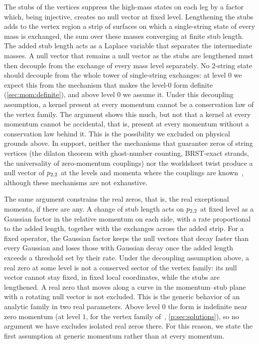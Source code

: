The stubs of the vertices suppress the high-mass states on each leg by a factor which, being injective, creates no null vector at fixed level.
Lengthening the stubs adds to the vertex region a strip of surfaces on which a single-string state of every mass is exchanged, the sum over these masses converging at finite stub length.
  The added stub length acts as a Laplace variable that separates the intermediate masses.
  A null vector that remains a null vector as the stubs are lengthened must then decouple from the exchange of every mass level separately.
  No $2$-string state should decouple from the whole tower of single-string exchanges: at level $0$ we expect this from the mechanism that makes the level-$0$ form definite (\cref{sec:mom:definite}), and above level $0$ we assume it.
  Under this decoupling assumption, a kernel present at every momentum cannot be a conservation law of the vertex family.
  The argument shows this much, but not that a kernel at every momentum cannot be accidental, that is, present at every momentum without a conservation law behind it.
  This is the possibility we excluded on physical grounds above.
  In support, neither the mechanisms that guarantee zeros of string vertices (the dilaton theorem with ghost-number counting, BRST-exact strands, the universality of zero-momentum couplings) nor the worldsheet twist produce a null vector of $p_{2,2}$ at the levels and momenta where the couplings are known~\cite{Erbin:2026:SL2CVerticesClosed}, although these mechanisms are not exhaustive.

The same argument constrains the real zeros, that is, the real exceptional momenta, if there are any.
  A change of stub length acts on $p_{2,2}$ at fixed level as a Gaussian factor in the relative momentum on each side, with a rate proportional to the added length, together with the exchanges across the added strip.
  For a fixed operator, the Gaussian factor keeps the null vectors that decay faster than every Gaussian and loses those with Gaussian decay once the added length exceeds a threshold set by their rate.
  Under the decoupling assumption above, a real zero at some level is not a conserved sector of the vertex family: its null vector cannot stay fixed, in fixed local coordinates, while the stubs are lengthened.
  A real zero that moves along a curve in the momentum--stub plane with a rotating null vector is not excluded.
  This is the generic behavior of an analytic family in two real parameters.
  Above level $0$ the form is indefinite near zero momentum (at level $1$, for the vertex family of~\cite{Erbin:2026:SL2CVerticesClosed}, \cref{p:sec:solutions}), so no argument we have excludes isolated real zeros there.
  For this reason, we state the first assumption at generic momentum rather than at every momentum.

